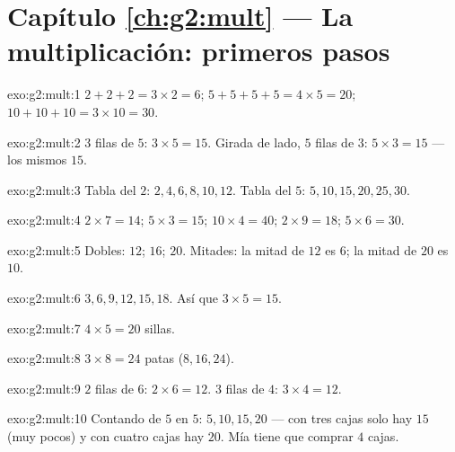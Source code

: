\section*{Capítulo \ref{ch:g2:mult} --- La multiplicación: primeros pasos}

\begin{solution}{exo:g2:mult:1}
$2 + 2 + 2 = 3 \times 2 = 6$; \quad
$5 + 5 + 5 + 5 = 4 \times 5 = 20$; \quad
$10 + 10 + 10 = 3 \times 10 = 30$.
\end{solution}

\begin{solution}{exo:g2:mult:2}
$3$ filas de $5$: $3 \times 5 = 15$. Girada de lado, $5$ filas de
$3$: $5 \times 3 = 15$ --- los mismos $15$.
\end{solution}

\begin{solution}{exo:g2:mult:3}
Tabla del $2$: $2, 4, 6, 8, 10, 12$. Tabla del $5$:
$5, 10, 15, 20, 25, 30$.
\end{solution}

\begin{solution}{exo:g2:mult:4}
$2 \times 7 = 14$; \quad $5 \times 3 = 15$; \quad
$10 \times 4 = 40$; \quad $2 \times 9 = 18$; \quad
$5 \times 6 = 30$.
\end{solution}

\begin{solution}{exo:g2:mult:5}
Dobles: $12$; $16$; $20$. Mitades: la mitad de $12$ es $6$; la mitad de
$20$ es $10$.
\end{solution}

\begin{solution}{exo:g2:mult:6}
$3, 6, 9, 12, 15, 18$. Así que $3 \times 5 = 15$.
\end{solution}

\begin{solution}{exo:g2:mult:7}
$4 \times 5 = 20$ sillas.
\end{solution}

\begin{solution}{exo:g2:mult:8}
$3 \times 8 = 24$ patas ($8, 16, 24$).
\end{solution}

\begin{solution}{exo:g2:mult:9}
$2$ filas de $6$: $2 \times 6 = 12$. $3$ filas de $4$:
$3 \times 4 = 12$.
\end{solution}

\begin{solution}{exo:g2:mult:10}
Contando de $5$ en $5$: $5, 10, 15, 20$ --- con tres cajas solo hay $15$
(muy pocos) y con cuatro cajas hay $20$. Mía tiene que comprar $4$ cajas.
\end{solution}
